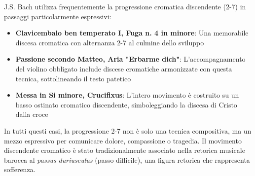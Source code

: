 \begin{esempio}
	\label{ex:bach_27}
	J.S. Bach utilizza frequentemente la progressione cromatica discendente (2-7) in passaggi particolarmente espressivi:
	
	\begin{itemize}
		\item \textbf{Clavicembalo ben temperato I, Fuga n. 4 in \Dodiesis  minore}: Una memorabile discesa cromatica con alternanza 2-7 al culmine dello sviluppo
		
		\item \textbf{Passione secondo Matteo, Aria "Erbarme dich"}: L'accompagnamento del violino obbligato include discese cromatiche armonizzate con questa tecnica, sottolineando il testo patetico
		
		\item \textbf{Messa in Si minore, Crucifixus}: L'intero movimento è costruito su un basso ostinato cromatico discendente, simboleggiando la discesa di Cristo dalla croce
	\end{itemize}
	
	In tutti questi casi, la progressione 2-7 non è solo una tecnica compositiva, ma un mezzo espressivo per comunicare dolore, compassione o tragedia. Il movimento discendente cromatico è stato tradizionalmente associato nella retorica musicale barocca al \textit{passus duriusculus} (passo difficile), una figura retorica che rappresenta sofferenza.
\end{esempio}

